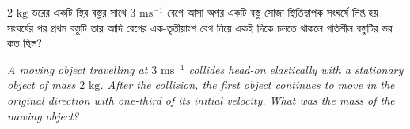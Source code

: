 \documentclass[12pt, a4paper]{article}
\begin{document}
\begin{tcolorbox}[questionbox={প্রশ্ন (Question) 47}]
\noindent
$2\text{ kg}$ ভরের একটি স্থির বস্তুর সাথে $3\text{ ms}^{-1}$ বেগে আসা অপর একটি বস্তু সোজা স্থিতিস্থাপক সংঘর্ষে লিপ্ত হয়। সংঘর্ষের পর প্রথম বস্তুটি তার আদি বেগের এক-তৃতীয়াংশ বেগ নিয়ে একই দিকে চলতে থাকলে গতিশীল বস্তুটির ভর কত ছিল?

\vspace{0.8em}
\begin{english}
\noindent\textit{\color{darkgray}
A moving object travelling at $3\text{ ms}^{-1}$ collides head-on elastically with a stationary object of mass $2\text{ kg}$. After the collision, the first object continues to move in the original direction with one-third of its initial velocity. What was the mass of the moving object?
}
\end{english}
\end{tcolorbox}
\end{document}
